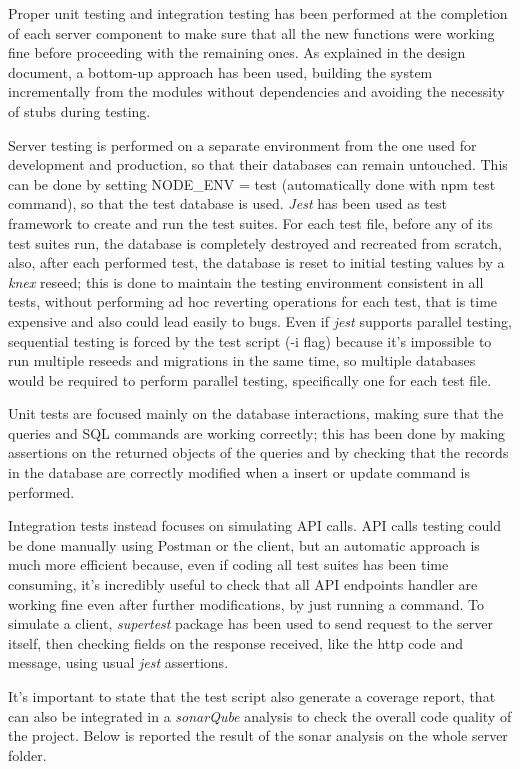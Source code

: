 Proper unit testing and integration testing has been performed at the completion of each server component to make sure that all the new functions were working fine before proceeding with the remaining ones. As explained in the design document, a bottom-up approach has been used, building the system incrementally from the modules without dependencies and avoiding the necessity of stubs during testing.

Server testing is performed on a separate environment from the one used for development and production, so that their databases can remain untouched. This can be done by setting NODE\_ENV = test (automatically done with npm test command), so that the test database is used. \textit{Jest} has been used as test framework to create and run the test suites. For each test file, before any of its test suites run, the database is completely destroyed and recreated from scratch, also, after each performed test, the database is reset to initial testing values by a \textit{knex} reseed; this is done to maintain the testing environment consistent in all tests, without performing ad hoc reverting operations for each test, that is time expensive and also could lead easily to bugs. Even if \textit{jest} supports parallel testing, sequential testing is forced by the test script (-i flag) because it's impossible to run multiple reseeds and migrations in the same time, so multiple databases would be required to perform parallel testing, specifically one for each test file.

Unit tests are focused mainly on the database interactions, making sure that the queries and SQL commands are working correctly; this has been done by making assertions on the returned objects of the queries and by checking that the records in the database are correctly modified when a insert or update command is performed.

Integration tests instead focuses on simulating API calls. API calls testing could be done manually using Postman or the client, but an automatic approach is much more efficient because, even if coding all test suites has been time consuming, it's incredibly useful to check that all API endpoints handler are working fine even after further modifications, by just running a command. To simulate a client, \textit{supertest} package has been used to send request to the server itself, then checking fields on the response received, like the http code and message, using usual \textit{jest} assertions.

It's important to state that the test script also generate a coverage report, that can also be integrated in a \textit{sonarQube} analysis to check the overall code quality of the project. Below is reported the result of the sonar analysis on the whole server folder.

